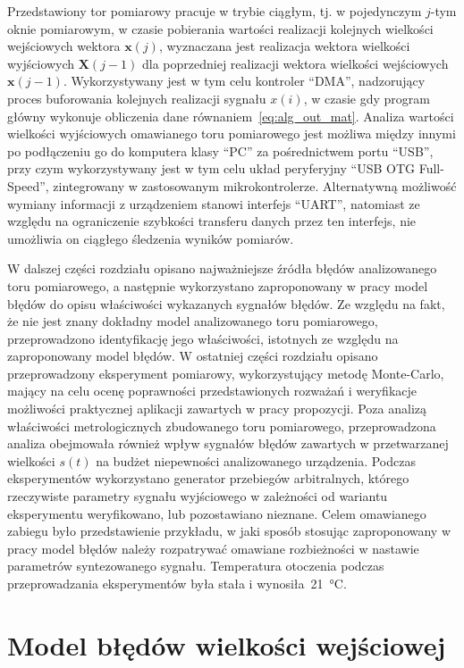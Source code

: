 Przedstawiony tor pomiarowy pracuje w trybie ciągłym, tj. w pojedynczym $j$-tym oknie pomiarowym, w czasie pobierania wartości realizacji kolejnych wielkości wejściowych wektora $\mathbf{x}(j)$, wyznaczana jest realizacja wektora wielkości wyjściowych $\mathbf{X}(j-1)$ dla poprzedniej realizacji wektora wielkości wejściowych $\mathbf{x}(j-1)$. Wykorzystywany jest w tym celu kontroler \enquote{DMA}, nadzorujący proces buforowania kolejnych realizacji sygnału $x(i)$, w czasie gdy program główny wykonuje obliczenia dane równaniem~\eqref{eq:alg_out_mat}. Analiza wartości wielkości wyjściowych omawianego toru pomiarowego jest możliwa między innymi po podłączeniu go do komputera klasy \enquote{PC} za pośrednictwem portu \enquote{USB}, przy czym wykorzystywany jest w tym celu układ peryferyjny \enquote{USB OTG Full-Speed}, zintegrowany w zastosowanym mikrokontrolerze. Alternatywną możliwość wymiany informacji z urządzeniem stanowi interfejs \enquote{UART}, natomiast ze względu na ograniczenie szybkości transferu danych przez ten interfejs, nie umożliwia on ciągłego śledzenia wyników pomiarów.

W dalszej części rozdziału opisano najważniejsze źródła błędów analizowanego toru pomiarowego, a następnie wykorzystano zaproponowany w pracy model błędów do opisu właściwości wykazanych sygnałów błędów. Ze względu na fakt, że nie jest znany dokładny model analizowanego toru pomiarowego, przeprowadzono identyfikację jego właściwości, istotnych ze względu na zaproponowany model błędów. W ostatniej części rozdziału opisano przeprowadzony eksperyment pomiarowy, wykorzystujący metodę Monte-Carlo, mający na celu ocenę poprawności przedstawionych rozważań i weryfikacje możliwości praktycznej aplikacji zawartych w pracy propozycji. Poza analizą właściwości metrologicznych zbudowanego toru pomiarowego, przeprowadzona analiza obejmowała również wpływ sygnałów błędów zawartych w przetwarzanej wielkości $s(t)$ na budżet niepewności analizowanego urządzenia. Podczas eksperymentów wykorzystano generator przebiegów arbitralnych, którego rzeczywiste parametry sygnału wyjściowego w zależności od wariantu eksperymentu weryfikowano, lub pozostawiano nieznane. Celem omawianego zabiegu było przedstawienie przykładu, w jaki sposób stosując zaproponowany w pracy model błędów należy rozpatrywać omawiane rozbieżności w nastawie parametrów syntezowanego sygnału. Temperatura otoczenia podczas przeprowadzania eksperymentów była stała i wynosiła~\qty{21}{\degreeCelsius}.

\section{Model błędów wielkości wejściowej}

